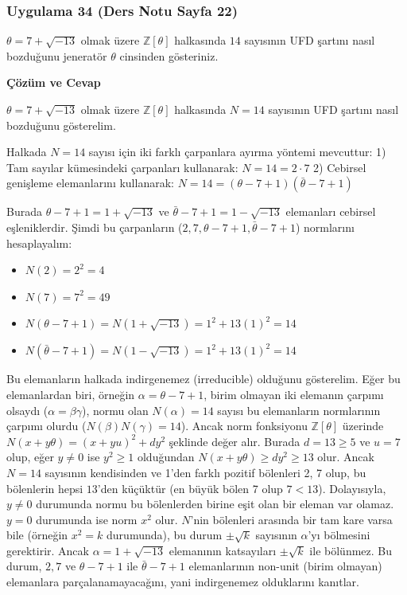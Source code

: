 \documentclass[11pt, a4paper]{article}
\newenvironment{cozum}{
    \vspace{0.5cm}
    \noindent\textcolor{green!60!black}{\faCheckCircle\enspace \textbf{\Large Çözüm ve Cevap}}\par\vspace{0.2cm}
}{}
\begin{document}
\newpage
\subsubsection{Uygulama 34 (Ders Notu Sayfa 22)}
\begin{sorubox}
$\theta = 7 + \sqrt{-13}$ olmak üzere $\mathbb{Z}[\theta]$ halkasında $14$ sayısının UFD şartını nasıl bozduğunu jeneratör $\theta$ cinsinden gösteriniz.
\end{sorubox}
\begin{cozum}
$\theta = 7 + \sqrt{-13}$ olmak üzere $\mathbb{Z}[\theta]$ halkasında $N = 14$ sayısının UFD şartını nasıl bozduğunu gösterelim.

Halkada $N = 14$ sayısı için iki farklı çarpanlara ayırma yöntemi mevcuttur:
1) Tam sayılar kümesindeki çarpanları kullanarak: $N = 14 = 2 \cdot 7$
2) Cebirsel genişleme elemanlarını kullanarak: $N = 14 = (\theta - 7 + 1)(\bar{\theta} - 7 + 1)$

Burada $\theta - 7 + 1 = 1 + \sqrt{-13}$ ve $\bar{\theta} - 7 + 1 = 1 - \sqrt{-13}$ elemanları cebirsel eşleniklerdir. Şimdi bu çarpanların ($2, 7, \theta - 7 + 1, \bar{\theta} - 7 + 1$) normlarını hesaplayalım:
\begin{itemize}
    \item $N(2) = 2^2 = 4$
    \item $N(7) = 7^2 = 49$
    \item $N(\theta - 7 + 1) = N(1 + \sqrt{-13}) = 1^2 + 13(1)^2 = 14$
    \item $N(\bar{\theta} - 7 + 1) = N(1 - \sqrt{-13}) = 1^2 + 13(1)^2 = 14$
\end{itemize}

Bu elemanların halkada indirgenemez (irreducible) olduğunu gösterelim. Eğer bu elemanlardan biri, örneğin $\alpha = \theta - 7 + 1$, birim olmayan iki elemanın çarpımı olsaydı ($\alpha = \beta \gamma$), normu olan $N(\alpha) = 14$ sayısı bu elemanların normlarının çarpımı olurdu ($N(\beta)N(\gamma) = 14$). Ancak norm fonksiyonu $\mathbb{Z}[\theta]$ üzerinde $N(x+y\theta) = (x+yu)^2 + dy^2$ şeklinde değer alır. Burada $d = 13 \ge 5$ ve $u = 7$ olup, eğer $y \neq 0$ ise $y^2 \ge 1$ olduğundan $N(x+y\theta) \ge dy^2 \ge 13$ olur. Ancak $N = 14$ sayısının kendisinden ve 1'den farklı pozitif bölenleri 2, 7 olup, bu bölenlerin hepsi $13$'den küçüktür (en büyük bölen 7 olup $7 < 13$). Dolayısıyla, $y \neq 0$ durumunda normu bu bölenlerden birine eşit olan bir eleman var olamaz. $y = 0$ durumunda ise norm $x^2$ olur. $N$'nin bölenleri arasında bir tam kare varsa bile (örneğin $x^2 = k$ durumunda), bu durum $\pm \sqrt{k}$ sayısının $\alpha$'yı bölmesini gerektirir. Ancak $\alpha = 1+\sqrt{-13}$ elemanının katsayıları $\pm \sqrt{k}$ ile bölünmez. Bu durum, $2, 7$ ve $\theta - 7 + 1$ ile $\bar{\theta} - 7 + 1$ elemanlarının non-unit (birim olmayan) elemanlara parçalanamayacağını, yani indirgenemez olduklarını kanıtlar.


\end{cozum}
\end{document}
